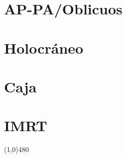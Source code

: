 \documentclass{article}
\begin{document}
\vspace{3pt}

\section*{AP-PA/Oblicuos}

\vspace{3pt}

\section*{Holocráneo}

\vspace{3pt}

\section*{Caja}

\vspace{3pt}


\section*{IMRT}
    
\vspace{3pt}


\begin{center}
\line(1,0){480}
\end{center}
\end{document}
